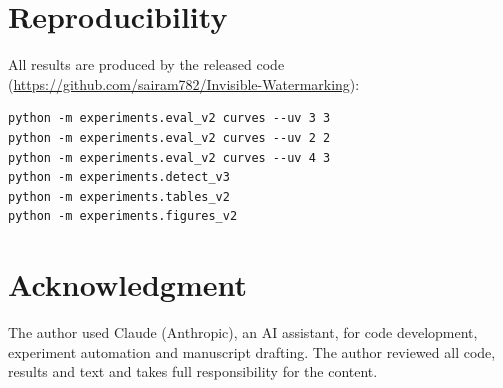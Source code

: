 \documentclass[conference,10pt]{IEEEtran}
\begin{document}
\section*{Reproducibility}
All results are produced by the released code
(\url{https://github.com/sairam782/Invisible-Watermarking}):
{\footnotesize
\begin{verbatim}
python -m experiments.eval_v2 curves --uv 3 3
python -m experiments.eval_v2 curves --uv 2 2
python -m experiments.eval_v2 curves --uv 4 3
python -m experiments.detect_v3
python -m experiments.tables_v2
python -m experiments.figures_v2
\end{verbatim}
}

\section*{Acknowledgment}
The author used Claude (Anthropic), an AI assistant, for code development,
experiment automation and manuscript drafting. The author reviewed all code,
results and text and takes full responsibility for the content.



\end{document}
